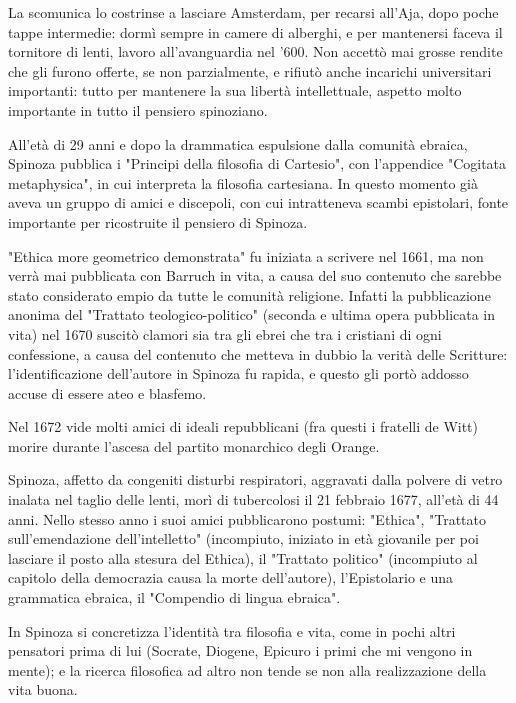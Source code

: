 La scomunica lo costrinse a lasciare Amsterdam, per recarsi all'Aja, dopo poche tappe intermedie: dormì sempre in camere di alberghi, e per mantenersi faceva il tornitore di lenti, lavoro all'avanguardia nel '600. Non accettò mai grosse rendite che gli furono offerte, se non parzialmente, e rifiutò anche incarichi universitari importanti: tutto per mantenere la sua libertà intellettuale, aspetto molto importante in tutto il pensiero spinoziano.

All'età di 29 anni e dopo la drammatica espulsione dalla comunità ebraica, Spinoza pubblica i "Principi della filosofia di Cartesio", con l'appendice "Cogitata metaphysica", in cui interpreta la filosofia cartesiana. In questo momento già aveva un gruppo di amici e discepoli, con cui intratteneva scambi epistolari, fonte importante per ricostruite il pensiero di Spinoza.

"Ethica more geometrico demonstrata" fu iniziata a scrivere nel 1661, ma non verrà mai pubblicata con Barruch in vita, a causa del suo contenuto che sarebbe stato considerato empio da tutte le comunità religione. Infatti la pubblicazione anonima del "Trattato teologico-politico" (seconda e ultima opera pubblicata in vita) nel 1670 suscitò clamori sia tra gli ebrei che tra i cristiani di ogni confessione, a causa del contenuto che metteva in dubbio la verità delle Scritture: l'identificazione dell'autore in Spinoza fu rapida, e questo gli portò addosso accuse di essere ateo e blasfemo.

Nel 1672 vide molti amici di ideali repubblicani (fra questi i fratelli de Witt) morire durante l'ascesa del partito monarchico degli Orange.

Spinoza, affetto da congeniti disturbi respiratori, aggravati dalla polvere di vetro inalata nel taglio delle lenti, morì di tubercolosi il 21 febbraio 1677, all'età di 44 anni. Nello stesso anno i suoi amici pubblicarono postumi: "Ethica", "Trattato sull'emendazione dell'intelletto" (incompiuto, iniziato in età giovanile per poi lasciare il posto alla stesura del Ethica), il "Trattato politico" (incompiuto al capitolo della democrazia causa la morte dell'autore), l'Epistolario e una grammatica ebraica, il "Compendio di lingua ebraica".

In Spinoza si concretizza l’identità tra filosofia e vita, come in pochi altri pensatori prima di lui (Socrate, Diogene, Epicuro i primi che mi vengono in mente); e la ricerca filosofica ad altro non tende se non alla realizzazione della vita buona.